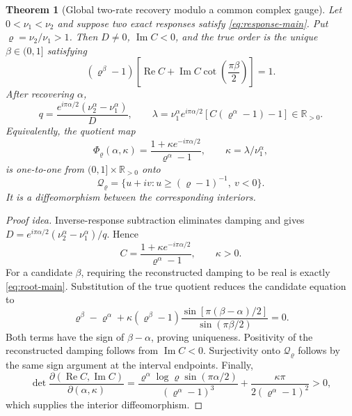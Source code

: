 \documentclass[11pt]{article}
\newtheorem{theorem}{Theorem}[section]
\theoremstyle{definition}
\theoremstyle{remark}
\newcommand{\R}{\mathbb R}
\begin{document}
\begin{theorem}[Global two-rate recovery modulo a common complex gauge]
\label{thm:two-rate-main}
Let $0<\nu_1<\nu_2$ and suppose two exact responses satisfy
\eqref{eq:response-main}.  Put $\varrho=\nu_2/\nu_1>1$.  Then $D\ne0$,
$\operatorname{Im}C<0$, and the true order is the unique
$\beta\in(0,1]$ satisfying
\begin{equation}
 (\varrho^\beta-1)
 \left[\operatorname{Re}C+
 \operatorname{Im}C\cot\left(\frac{\pi\beta}{2}\right)\right]=1.
 \label{eq:root-main}
\end{equation}
After recovering $\alpha$,
\begin{equation}
 q=\frac{e^{i\pi\alpha/2}(\nu_2^\alpha-\nu_1^\alpha)}{D},
 \qquad
 \lambda=\nu_1^\alpha e^{i\pi\alpha/2}
 [C(\varrho^\alpha-1)-1]\in\R_{>0}.
 \label{eq:recovery-main}
\end{equation}
Equivalently, the quotient map
\begin{equation}
 \Phi_{\varrho}(\alpha,\kappa)=
 \frac{1+\kappa e^{-i\pi\alpha/2}}{\varrho^\alpha-1},
 \qquad \kappa=\lambda/\nu_1^\alpha,
 \label{eq:quotient-map-main}
\end{equation}
is one-to-one from $(0,1]\times\R_{>0}$ onto
\[
 \mathcal Q_\varrho=
 \{u+iv:u\ge(\varrho-1)^{-1},\ v<0\}.
\]
It is a diffeomorphism between the corresponding interiors.
\end{theorem}

\begin{proof}[Proof idea]
Inverse-response subtraction eliminates damping and gives
$D=e^{i\pi\alpha/2}(\nu_2^\alpha-\nu_1^\alpha)/q$.  Hence
\[
 C=\frac{1+\kappa e^{-i\pi\alpha/2}}{\varrho^\alpha-1},
 \qquad \kappa>0.
\]
For a candidate $\beta$, requiring the reconstructed damping to be real is
exactly \eqref{eq:root-main}.  Substitution of the true quotient reduces the
candidate equation to
\[
 \varrho^\beta-\varrho^\alpha
 +\kappa(\varrho^\beta-1)
 \frac{\sin[\pi(\beta-\alpha)/2]}{\sin(\pi\beta/2)}=0.
\]
Both terms have the sign of $\beta-\alpha$, proving uniqueness.  Positivity
of the reconstructed damping follows from $\operatorname{Im}C<0$.  Surjectivity
onto $\mathcal Q_\varrho$ follows by the same sign argument at the interval
endpoints.  Finally,
\[
 \det\frac{\partial(\operatorname{Re}C,\operatorname{Im}C)}
 {\partial(\alpha,\kappa)}=
 \frac{\varrho^\alpha\log\varrho\sin(\pi\alpha/2)}
 {(\varrho^\alpha-1)^3}
 +\frac{\kappa\pi}{2(\varrho^\alpha-1)^2}>0,
\]
which supplies the interior diffeomorphism.
\end{proof}
\end{document}
